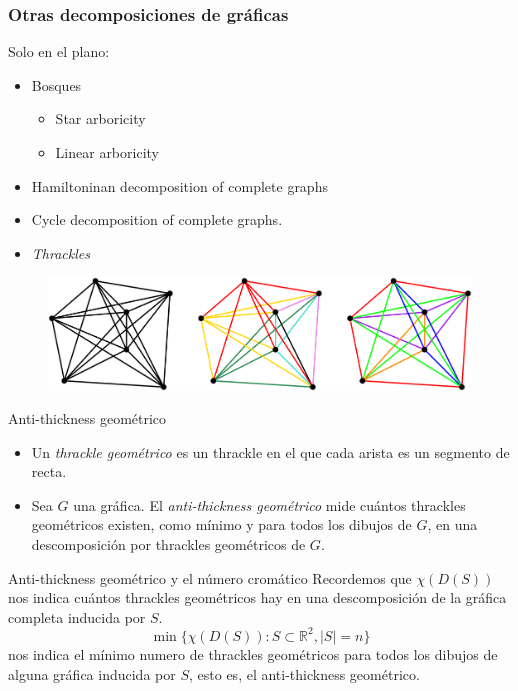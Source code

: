 \begin{frame}
	\frametitle{Otras decomposiciones de gráficas}
	Solo en el plano:
	\begin{itemize}
		\item Bosques
		\begin{itemize}
			\item Star arboricity
			\item Linear arboricity
		\end{itemize}
		\item Hamiltoninan decomposition of complete graphs
		\item Cycle decomposition of complete graphs.
		\item \emph{Thrackles}
	\end{itemize}
	\begin{figure}
		\centering
		\includegraphics[width=1\linewidth]{images/other_decompositions}
	\end{figure}
\end{frame}

\begin{frame}{Anti-thickness geométrico}
\begin{itemize}
	\item Un \emph{thrackle geométrico} es un thrackle en el que cada arista es un segmento de recta.
	\item[] Sea $G$ una gráfica. El \emph{anti-thickness geométrico} mide cuántos thrackles geométricos existen, como mínimo y para todos los dibujos de $G$, en una descomposición por thrackles geométricos de $G$.
\end{itemize}

\end{frame}
\begin{frame}{Anti-thickness geométrico y el número cromático}
Recordemos que $\chi(D(S))$ nos indica cuántos thrackles geométricos hay en una descomposición de la gráfica completa inducida por $S$. 
\[
\min\{ \chi(D(S)) : S \subset \mathbb{R}^2, |S| = n \}
\] nos indica el mínimo numero de thrackles geométricos para todos los dibujos de alguna gráfica inducida por $S$, esto es, el anti-thickness geométrico.
\end{frame}




